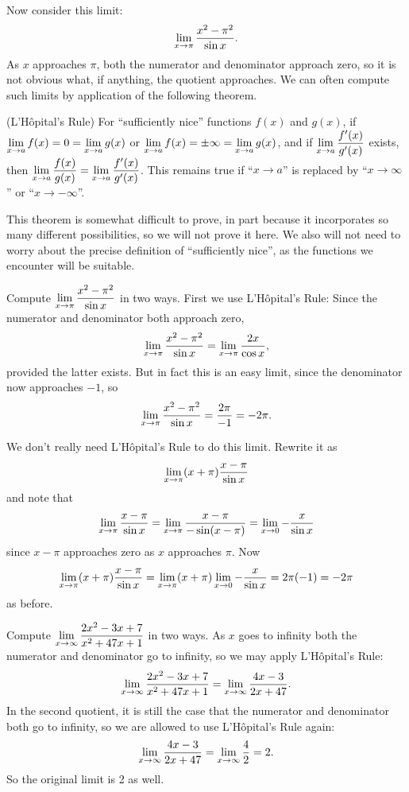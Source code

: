 Now consider this limit:
$$\lim_{x\to \pi}{x^2-\pi^2\over \sin x}.$$
As $x$ approaches $\pi$, both the numerator and denominator approach
zero, so it is not obvious what, if anything, the quotient
approaches. We can often compute such limits by application of the
following theorem.

\thm (L'H\^opital's Rule) For ``sufficiently nice'' functions $f(x)$
and $g(x)$, if $\displaystyle\lim_{x\to a} f(x)= 0 = \lim_{x\to a}
g(x)$ or $\displaystyle\lim_{x\to a} f(x)= \pm\infty = \lim_{x\to a}
g(x)$, and if $\displaystyle\lim_{x\to a}{f'(x)\over g'(x)}$ exists,
then $\displaystyle\lim_{x\to a}{f(x)\over g(x)}=\lim_{x\to
a}{f'(x)\over g'(x)}$.  This remains true if ``$x\to a$'' is replaced
by ``$x\to \infty$'' or ``$x\to -\infty$''.
\endthmnoproof
{}

This theorem is somewhat difficult to prove, in part because it
incorporates so many different possibilities, so we will not prove it
here. We also will not need to worry about the precise definition of 
``sufficiently nice'', as the functions we encounter will be
suitable. 


\example
Compute $\displaystyle\lim_{x\to \pi}{x^2-\pi^2\over \sin x}$ in two ways.
\msk
First we use L'H\^opital's Rule: Since the numerator and denominator
both approach zero,
$$\lim_{x\to \pi}{x^2-\pi^2\over \sin x}=
\lim_{x\to \pi}{2x \over \cos x},$$
provided the latter exists. But in fact this is an easy limit, since
the denominator now approaches $-1$, so 
$$\lim_{x\to \pi}{x^2-\pi^2\over \sin x}={2\pi\over -1} = -2\pi.$$

We don't really need L'H\^opital's Rule to do this limit. Rewrite it
as 
$$\lim_{x\to \pi}(x+\pi){x-\pi\over \sin x}$$
and note that 
$$\lim_{x\to \pi}{x-\pi\over \sin x}=
\lim_{x\to \pi}{x-\pi\over -\sin (x-\pi)}=
\lim_{x\to 0}-{x\over \sin x}$$
since $x-\pi$ approaches zero as $x$ approaches $\pi$.
Now
$$\lim_{x\to \pi}(x+\pi){x-\pi\over \sin x}=
\lim_{x\to \pi}(x+\pi)\lim_{x\to 0}-{x\over \sin x}=
2\pi(-1)=-2\pi$$
as before.
\endexample

\example Compute $\displaystyle\lim_{x\to \infty}{2x^2-3x+7\over
x^2+47x+1}$ in two ways.
\msk
As $x$ goes to infinity both the numerator and denominator go to
infinity, so we may apply L'H\^opital's Rule:
$$\lim_{x\to \infty}{2x^2-3x+7\over x^2+47x+1}=
\lim_{x\to \infty}{4x-3\over 2x+47}.$$
In the second quotient, it is still the case that the numerator and
denominator both go to infinity, so we are allowed to use
L'H\^opital's Rule again:
$$\lim_{x\to \infty}{4x-3\over 2x+47}=\lim_{x\to \infty}{4\over 2}=2.$$
So the original limit is 2 as well.


